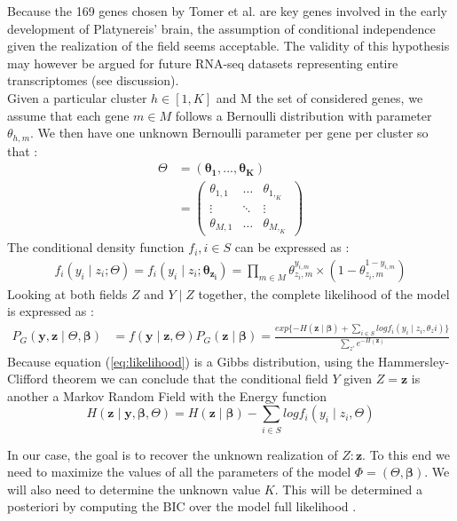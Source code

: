Because the 169 genes chosen by Tomer et al. \cite{Tomer10} are key genes involved in the early development of Platynereis' brain, the assumption of conditional independence given the realization of the field seems acceptable. The validity of this hypothesis may however be argued for future RNA-seq datasets representing entire transcriptomes (see discussion).\\
Given a particular cluster $h \in [1,K]$ and M the set of considered genes, we assume that each gene $m \in M$ follows a Bernoulli distribution with parameter $\theta_{h,m}$. We then have one unknown Bernoulli parameter per gene per cluster so that :
\begin{align*}
\Theta &= (\mathbf{\theta_1},...,\mathbf{\theta_K})\\
&= \left( \begin{array} {ccc}
\theta_{1,1} & \ldots  & \theta_{1,_K}\\
\vdots & \ddots & \vdots\\
\theta_{M,1} & \ldots & \theta_{M,_K} \end{array} \right)
\end{align*}
The conditional density function $f_i, i \in S$ can be expressed as :
\begin{align}
f_i(y_i \mid z_i ; \Theta) = f_i(y_i \mid z_i ; \mathbf{\theta_{z_i}}) = \prod_{m \in M} \theta_{z_i,m}^{y_{i,m}} \times (1-\theta_{z_i,m}^{1-y_{i,m}})
\end{align}
Looking at both fields $Z$ and $Y \mid Z$ together, the complete likelihood of the model is expressed as :
\begin{align}
\label{eq:likelihood}
P_G(\mathbf{y},\mathbf{z} \mid \Theta, \mathbf{\beta}) &= f(\mathbf{y} \mid \mathbf{z}, \Theta)P_G(\mathbf{z} \mid \mathbf{\beta}) = \frac{exp\{{-H(\mathbf{z} \mid \mathbf{\beta})} + \sum\limits_{i \in S}log f_i(y_i \mid z_i, \theta_zi)\}}{\sum\limits_{z'} e^{-H(\mathbf{z})}}
\end{align}
Because equation (\ref{eq:likelihood}) is a Gibbs distribution, using the Hammersley-Clifford theorem we can conclude that the conditional field $Y$ given $Z =\mathbf{z}$ is another a Markov Random Field with the Energy function 
\[H(\mathbf{z} \mid \mathbf{y}, \mathbf{\beta}, \Theta) = H(\mathbf{z} \mid \mathbf{\beta}) - \sum\limits_{i \in S} log f_i(y_i \mid z_i, \Theta)\]

In our case, the goal is to recover the unknown realization of $Z: \mathbf{z}$. To this end we need to maximize the values of all the parameters of the model $\Phi = (\Theta, \mathbf{\beta})$. We will also need to determine the unknown value $K$. This will be determined a posteriori by computing the BIC over the model full likelihood \cite{Schwarz78}.

